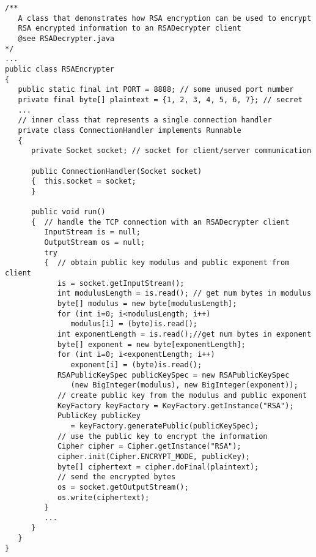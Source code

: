 \begin{lstlisting}[caption=RSA encryption]
/**
   A class that demonstrates how RSA encryption can be used to encrypt
   RSA encrypted information to an RSADecrypter client
   @see RSADecrypter.java
*/
...
public class RSAEncrypter
{
   public static final int PORT = 8888; // some unused port number
   private final byte[] plaintext = {1, 2, 3, 4, 5, 6, 7}; // secret
   ...
   // inner class that represents a single connection handler
   private class ConnectionHandler implements Runnable
   {
      private Socket socket; // socket for client/server communication

      public ConnectionHandler(Socket socket)
      {  this.socket = socket;
      }

      public void run()
      {  // handle the TCP connection with an RSADecrypter client
         InputStream is = null;
         OutputStream os = null;
         try
         {  // obtain public key modulus and public exponent from client
            is = socket.getInputStream();
            int modulusLength = is.read(); // get num bytes in modulus
            byte[] modulus = new byte[modulusLength];
            for (int i=0; i<modulusLength; i++)
               modulus[i] = (byte)is.read();
            int exponentLength = is.read();//get num bytes in exponent
            byte[] exponent = new byte[exponentLength];
            for (int i=0; i<exponentLength; i++)
               exponent[i] = (byte)is.read();
            RSAPublicKeySpec publicKeySpec = new RSAPublicKeySpec
               (new BigInteger(modulus), new BigInteger(exponent));
            // create public key from the modulus and public exponent
            KeyFactory keyFactory = KeyFactory.getInstance("RSA");
            PublicKey publicKey
               = keyFactory.generatePublic(publicKeySpec);
            // use the public key to encrypt the information
            Cipher cipher = Cipher.getInstance("RSA");
            cipher.init(Cipher.ENCRYPT_MODE, publicKey);
            byte[] ciphertext = cipher.doFinal(plaintext);
            // send the encrypted bytes
            os = socket.getOutputStream();
            os.write(ciphertext);
         }
         ...
      }
   }
}
\end{lstlisting}

